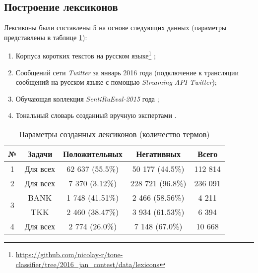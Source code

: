 \subsection{Построение лексиконов}

Лексиконы были составлены 5 на основе следующих данных (параметры представлены
в таблице \ref{table:createdLexicons}):

\begin{enumerate}
    \item Корпуса коротких текстов на русском языке\footnote{
            \url{https://github.com/nicolay-r/tone-classifier/tree/2016_jan_contest/data/lexicons}
    }
    \cite{rubtsovaCollection};
    \item Сообщений сети {\it Twitter }  за январь 2016 года (подключение к трансляции
        сообщений на русском языке с помощью {\it Streaming API Twitter});
    \item Обучающая коллекция {\it SentiRuEval-2015} года \cite{dialog2015};
    \item Тональный словарь созданный вручную экспертами \cite{expertLexicon}.
\end{enumerate}

\begin{table}[ht!]
\centering
\caption{Параметры созданных лексиконов (количество термов)}
\label{table:createdLexicons}
\begin{tabular}{|c|c|c|c|c|}
\hline
№                  & \multicolumn{1}{c|}{Задачи} & \multicolumn{1}{c|}{Положительных} & \multicolumn{1}{c|}{Негативных} & \multicolumn{1}{c|}{Всего} \\ \hline
1                  & Для всех                    & 62 637 (55.5\%)                              & 50 177 (44.5\%)                         & 112 814                            \\ \hline
2                  & Для всех                    & 7 370 (3.12\%)                               & 228 721 (96.8\%)                        & 236 091                            \\ \hline
\multirow{2}{*}{3} & BANK                        & 1 748 (41.51\%)                              & 2 466 (58.56\%)                         & 4 211                              \\ \cline{2-5}
                   & TKK                         & 2 460 (38.47\%)                              & 3 934 (61.53\%)                         & 6 394                              \\ \hline
4                  & Для всех                    & 2 774 (26.0\%)                               & 7 148 (67.0\%)                          & 10 668                             \\ \hline
\end{tabular}
\end{table}

